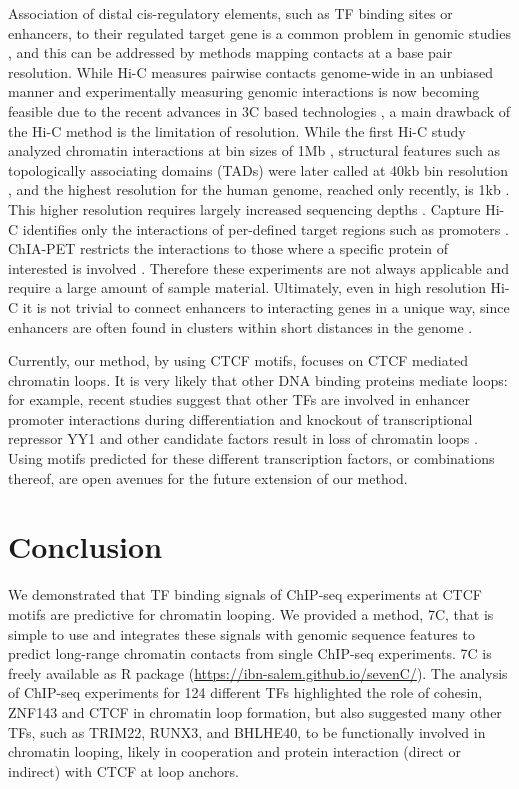 \documentclass[a4paper,twoside=true,openright,parskip=full,chapterprefix=true,11pt,headings=normal,bibliography=totoc,listof=totoc,titlepage=on,captions=tableabove,draft=false]{scrreprt}
\theoremstyle{definition}
\theoremstyle{definition}
\theoremstyle{definition}
\theoremstyle{remark}
\begin{document}
Association of distal cis-regulatory elements, such as TF binding sites
or enhancers, to their regulated target gene is a common problem in
genomic studies \citep{Mora2015}, and this can be addressed by methods
mapping contacts at a base pair resolution. While Hi-C measures pairwise
contacts genome-wide in an unbiased manner and experimentally measuring
genomic interactions is now becoming feasible due to the recent advances
in 3C based technologies \citep{Sati2016}, a main drawback of the Hi-C
method is the limitation of resolution. While the first Hi-C study
analyzed chromatin interactions at bin sizes of 1Mb
\citep{Lieberman-Aiden2009}, structural features such as topologically
associating domains (TADs) were later called at 40kb bin resolution
\citep{Dixon2012}, and the highest resolution for the human genome,
reached only recently, is 1kb \citep{Rao2014}. This higher resolution
requires largely increased sequencing depths \citep{Rao2014, Bonev2017}.
Capture Hi-C identifies only the interactions of per-defined target
regions such as promoters \citep{Dryden2014, Mifsud2015}. ChIA-PET
restricts the interactions to those where a specific protein of
interested is involved \citep{Heidari2014, Fullwood2009, Tang2015}.
Therefore these experiments are not always applicable and require a
large amount of sample material. Ultimately, even in high resolution
Hi-C it is not trivial to connect enhancers to interacting genes in a
unique way, since enhancers are often found in clusters within short
distances in the genome \citep{Whyte2013, Parker2013}.

Currently, our method, by using CTCF motifs, focuses on CTCF mediated
chromatin loops. It is very likely that other DNA binding proteins
mediate loops: for example, recent studies suggest that other TFs are
involved in enhancer promoter interactions during differentiation
\citep{Bonev2017} and knockout of transcriptional repressor YY1 and
other candidate factors result in loss of chromatin loops
\citep{Weintraub2018}. Using motifs predicted for these different
transcription factors, or combinations thereof, are open avenues for the
future extension of our method.

\hypertarget{conclusion-2}{%
\section{Conclusion}\label{conclusion-2}}

We demonstrated that TF binding signals of ChIP-seq experiments at CTCF
motifs are predictive for chromatin looping. We provided a method, 7C,
that is simple to use and integrates these signals with genomic sequence
features to predict long-range chromatin contacts from single ChIP-seq
experiments. 7C is freely available as R package
(\url{https://ibn-salem.github.io/sevenC/}). The analysis of ChIP-seq
experiments for 124 different TFs highlighted the role of cohesin,
ZNF143 and CTCF in chromatin loop formation, but also suggested many
other TFs, such as TRIM22, RUNX3, and BHLHE40, to be functionally
involved in chromatin looping, likely in cooperation and protein
interaction (direct or indirect) with CTCF at loop anchors.
\end{document}
